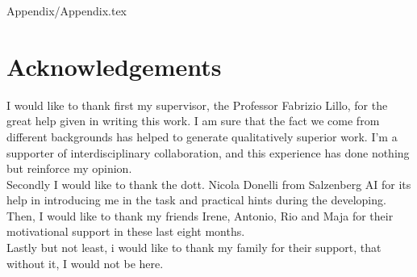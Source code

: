 \documentclass[12pt,a4paper]{book}
\begin{document}
    {Appendix/Appendix.tex}
    
    \newpage
    \chapter*{Acknowledgements}
    I would like to thank first my supervisor, the Professor Fabrizio Lillo, for the great help given in writing this work. I am sure that the fact we come from different backgrounds has helped to generate qualitatively superior work. I'm a supporter of interdisciplinary collaboration, and this experience has done nothing but reinforce my opinion.  \\
    Secondly I would like to thank the dott. Nicola Donelli from Salzenberg AI for its help in introducing me in the task and practical hints during the developing. \\
    Then, I would like to thank my friends Irene, Antonio, Rio and Maja for their motivational support in these last eight months. \\
    Lastly but not least, i would like to thank my family for their support, that without it, I would not be here.
    
    \vfill
\end{document}
